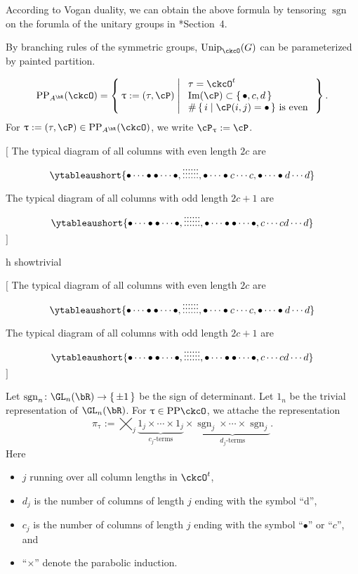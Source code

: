 \documentclass[12pt,a4paper]{amsart}
\let\ytb=\ytableaushort
\newcommand{\trivial}[2][]{\if\relax\detokenize{#1}\relax
  {%
      \color{orange} \vspace{0em} $[$  #2 $]$
      \color{black}
  }
  \else
\ifx#1h
\ifcsname showtrivial\endcsname
{%
    \color{orange} \vspace{0em}  $[$ #2 $]$
    \color{black}
}
\fi
\else {\red Wrong argument!} \fi
\fi
}
\def\Im{\operatorname{Im}}
\newcommand{\sgn}{\operatorname{sgn}}
\numberwithin{equation}{section}
\theoremstyle{remark}
\def\Unip{\mathrm{Unip}}
\def\PP{\mathrm{PP}}
\def\Im{\mathrm{Im}}
\begin{document}
According to Vogan duality,  we can obtain the above formula by tensoring $\sgn$
on the forumla of the unitary groups in \cite{BV.W}*{Section~4}.

By branching rules of the symmetric groups,  $\Unip_{\ckcO}(G)$ can be parameterized by painted partition. 

\begin{equation}\label{eq:PP.AR}
\PP_{A^{\bR}}(\ckcO) = \Set{\uptau:=(\tau, \cP)|
  \begin{array}{l}
    \text{$\tau = \ckcO^{t}$}\\
    \text{$\Im(\cP)\subset \set{\bullet,c,d}$}\\
    \text{$\#\set{i|\cP(i,j)=\bullet}$ is even}
  \end{array}
}.
\end{equation}
For $\uptau:=(\tau,\cP)\in \PP_{A^{\bR}}(\ckcO)$, we write $\cP_{\uptau}:= \cP$.

\trivial{
The typical diagram of all columns with even length $2c$ are
\[
\ytb{\bullet\cdots\bullet\bullet\cdots\bullet,\vdots\vdots\vdots\vdots\vdots\vdots,
\bullet\cdots\bullet c\cdots c,
\bullet\cdots\bullet d\cdots d
}  
\]

The typical diagram of all columns with odd length $2c+1$ are
\[
\ytb{\bullet\cdots\bullet\bullet\cdots\bullet,\vdots\vdots\vdots\vdots\vdots\vdots,
\bullet\cdots\bullet \bullet\cdots\bullet ,
c\cdots c d\cdots d
}  
\]
}

Let $\sgn_n\colon \GL_n(\bR)\rightarrow \set{\pm 1}$ be the sign of determinant. 
Let $1_n$ be the trivial representation of $\GL_n(\bR)$. 
For $\uptau\in \PP{\ckcO}$, we attache the representation 
\begin{equation}\label{eq:u.GLR}
\pi_\uptau := 
\bigtimes_{j} \underbrace{1_j \times \cdots \times 1_j}_{c_j\text{-terms}}\times
\underbrace{\sgn_j \times \cdots \times {\sgn_j} }_{d_j\text{-terms}}.
\end{equation}
Here 
\begin{itemize}
  \item 
$j$ running over all column lengths in $\ckcO^t$, 
\item $d_j$ is the number of
columns of length $j$ ending with the symbol ``d'',
\item  $c_j$ is the number of
columns of length $j$ ending with the symbol ``$\bullet$'' or ``$c$'', and 
\item  ``$\times$'' denote the parabolic induction.  
\end{itemize}
\end{document}
